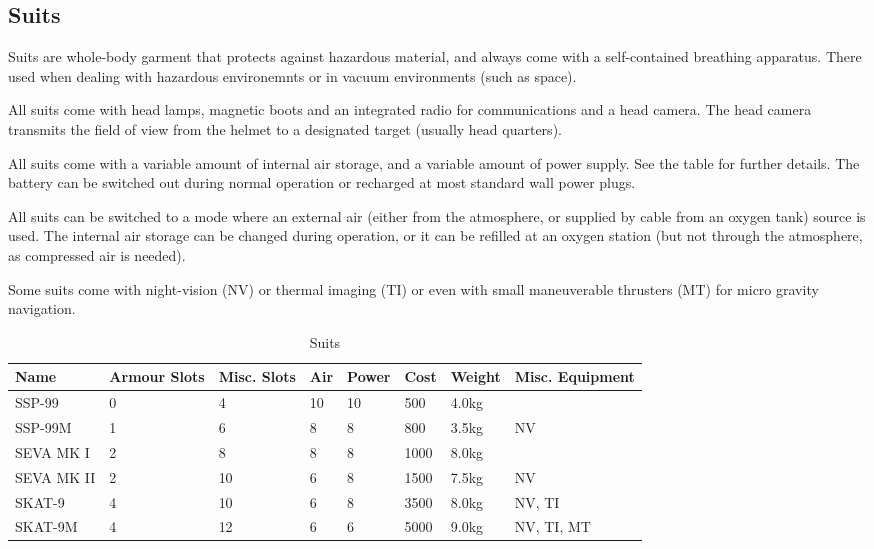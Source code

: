 \subsection{Suits}
\label{sub:9-Suits}

Suits are whole-body garment that protects against hazardous material, and
always come with a self-contained breathing apparatus. There used when dealing
with hazardous environemnts or in vacuum environments (such as space).

All suits come with head lamps, magnetic boots and an integrated radio for
communications and a head camera. The head camera transmits the field of view
from the helmet to a designated target (usually head quarters).

All suits come with a variable amount of internal air storage, and a variable
amount of power supply. See the table for further details. The battery can be
switched out during normal operation or recharged at most standard wall power
plugs.

All suits can be switched to a mode where an external air (either from the
atmosphere, or supplied by cable from an oxygen tank) source is used.  The
internal air storage can be changed during operation, or it can be refilled at
an oxygen station (but not through the atmosphere, as compressed air is needed).

Some suits come with night-vision (NV) or thermal imaging (TI) or even with
small maneuverable thrusters (MT) for micro gravity navigation.

\begin{table}
  \caption{Suits}
  \label{tab:Suits}
  \begin{center}
    \begin{tabular}{| l | l | l | l | l | l | l | l |}

      \hline
      \textbf{Name} & \textbf{Armour Slots} & \textbf{Misc. Slots} &
      \textbf{Air} & \textbf{Power} & \textbf{Cost} & \textbf{Weight} &
      \textbf{Misc. Equipment} \\ \hline

      SSP-99     & 0 &  4 & 10 & 10 &  500 & 4.0kg & \\ \hline
      SSP-99M    & 1 &  6 &  8 &  8 &  800 & 3.5kg & NV \\ \hline

      SEVA MK I  & 2 &  8 &  8 &  8 & 1000 & 8.0kg & \\ \hline
      SEVA MK II & 2 & 10 &  6 &  8 & 1500 & 7.5kg & NV \\ \hline

      SKAT-9     & 4 & 10 &  6 &  8 & 3500 & 8.0kg & NV, TI \\ \hline
      SKAT-9M    & 4 & 12 &  6 &  6 & 5000 & 9.0kg & NV, TI, MT \\ \hline

    \end{tabular}
  \end{center}
\end{table}


